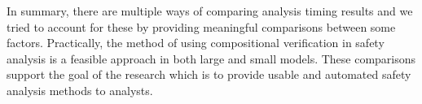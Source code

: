 In summary, there are multiple ways of comparing analysis timing results and we tried to account for these by providing meaningful comparisons between some factors. Practically, the method of using compositional verification in safety analysis is a feasible approach in both large and small models. These comparisons support the goal of the research which is to provide usable and automated safety analysis methods to analysts. 

